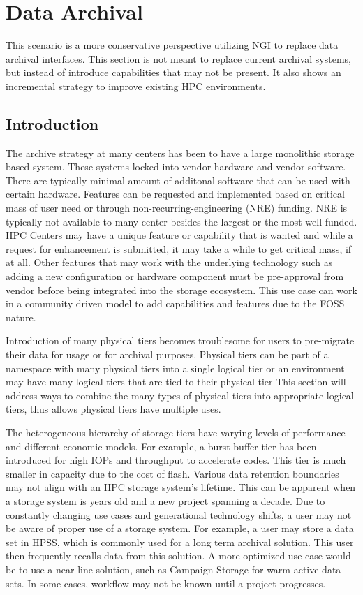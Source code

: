 \documentclass[a4paper, twocolumn]{article}
\begin{document}
\section{Data Archival}
This scenario is a more conservative perspective utilizing NGI to replace data archival interfaces. 
This section is not meant to replace current archival systems, but instead of introduce capabilities that may not be present.
It also shows an incremental strategy to improve existing HPC environments.

\subsection{Introduction}
The archive strategy at many centers has been to have a large monolithic storage based system. 
These systems locked into vendor hardware and vendor software. 
There are typically minimal amount of additonal software that can be used with certain hardware. 
Features can be requested and implemented based on critical mass of user need or through non-recurring-engineering (NRE) funding. 
NRE is typically not available to many center besides the largest or the most well funded. 
HPC Centers may have a unique feature or capability that is wanted and while a request for enhancement is submitted, it may take a while to get critical mass, if at all.
Other features that may work with the underlying technology such as adding a new configuration or hardware component must be pre-approval from vendor before being integrated into the storage ecosystem.
This use case can work in a community driven model to add capabilities and features due to the FOSS nature.

Introduction of many physical tiers becomes troublesome for users to pre-migrate their data for usage or for archival purposes.
Physical tiers can be part of a namespace with many physical tiers into a single logical tier or an environment may have many logical tiers that are tied to their physical tier
This section will address ways to combine the many types of physical tiers into appropriate logical tiers, thus allows physical tiers have multiple uses.

The heterogeneous hierarchy of storage tiers have varying levels of performance and different economic models. 
For example, a burst buffer tier has been introduced for high IOPs and throughput to accelerate codes.
This tier is much smaller in capacity due to the cost of flash.
Various data retention boundaries may not align with an HPC storage system’s lifetime. 
This can be apparent when a storage system is years old and a new project spanning a decade.
Due to constantly changing use cases and generational technology shifts, a user may not be aware of proper use of a storage system.
For example, a user may store a data set in HPSS, which is commonly used for a long term archival solution.
This user then frequently recalls data from this solution.
A more optimized use case would be to use a near-line solution, such as Campaign Storage for warm active data sets.
In some cases, workflow may not be known until a project progresses.
\end{document}
